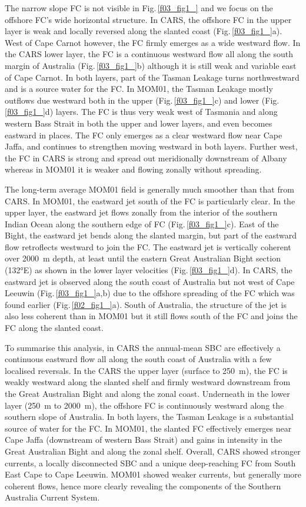 \documentclass[preprint,3p,review,12pt]{elsarticle}
\begin{document}
The narrow slope FC is not visible in Fig.\,\ref{f03_fig1_} and we focus on the offshore FC's wide horizontal structure.
In CARS, the offshore FC in the upper layer is weak and locally reversed along the slanted coast (Fig.\,\ref{f03_fig1_}a). West of Cape Carnot however, the FC firmly emerges as a wide westward flow.
In the CARS lower layer, the FC is a continuous westward flow all along the south margin of Australia (Fig.\,\ref{f03_fig1_}b) although it is still weak and variable east of Cape Carnot.
In both layers, part of the Tasman Leakage turns northwestward and is a source water for the FC\@.
In MOM01, the Tasman Leakage mostly outflows due westward both in the upper (Fig.\,\ref{f03_fig1_}c) and lower (Fig.\,\ref{f03_fig1_}d) layers. The FC is thus very weak west of Tasmania and along western Bass Strait in both the upper and lower layers, and even becomes eastward in places. The FC only emerges as a clear westward flow near Cape Jaffa, and continues to strengthen moving westward in both layers. 
Further west, the FC in CARS
is strong and spread out meridionally downstream of Albany whereas in MOM01 it is weaker and flowing zonally without spreading.

The long-term average MOM01 field is generally much smoother than that from CARS\@. In MOM01, the eastward jet south of the FC is particularly clear.
In the upper layer, the eastward jet flows zonally from the interior of the southern Indian Ocean along the southern edge of FC (Fig.\,\ref{f03_fig1_}c). East of the Bight, the eastward jet bends along the slanted margin, but part of the eastward flow retroflects westward to join the FC\@.
The eastward jet is vertically coherent over \SI{2000}{\meter} depth, at least until the eastern Great Australian Bight section (\ang{132}E) as shown in the lower layer velocities (Fig.\,\ref{f03_fig1_}d). In CARS, the eastward jet is observed along the south coast of Australia but not west of Cape Leeuwin (Fig.\,\ref{f03_fig1_}a,b) due to the offshore spreading of the FC
which was found earlier (Fig.\,\ref{f02_fig1_}a). South of Australia, the structure of the jet is also
less coherent
than in MOM01
but it still flows south of the FC and
joins the FC along the slanted coast.

To summarise this analysis, in CARS the annual-mean SBC are effectively a continuous eastward flow all along the south coast of Australia with a few localised reversals.
In the CARS the upper layer (surface to \SI{250}{\meter}), the FC is weakly westward along the slanted shelf and firmly westward downstream from the Great Australian Bight and along the zonal coast. Underneath in the lower layer (\SI{250}{\meter} to \SI{2000}{\meter}), the offshore FC is continuously westward along the southern slope of Australia. In both layers, the Tasman Leakage is
a substantial source of water for the FC\@.
In MOM01, the slanted FC effectively emerges near Cape Jaffa (downstream of western Bass Strait) and gains in intensity in the Great Australian Bight and along the zonal shelf. Overall, CARS showed stronger currents, a locally disconnected SBC and a unique deep-reaching FC from South East Cape to Cape Leeuwin. MOM01 showed weaker currents, but generally more coherent flows,
hence more clearly revealing the
components of the Southern Australia Current System. 
\end{document}
